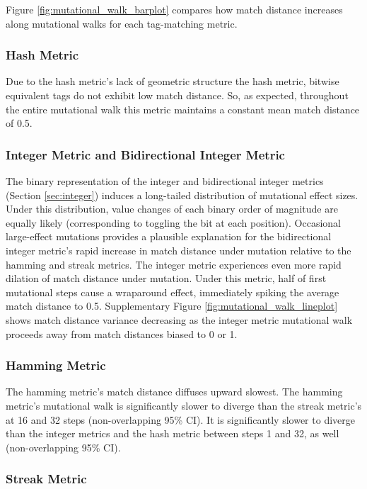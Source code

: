 Figure \ref{fig:mutational_walk_barplot} compares how match distance increases along mutational walks for each tag-matching metric.

\subsubsection{Hash Metric}

Due to the hash metric's lack of geometric structure the hash metric, bitwise equivalent tags do not exhibit low match distance.
So, as expected, throughout the entire mutational walk this metric maintains a constant mean match distance of 0.5.

\subsubsection{Integer Metric and Bidirectional Integer Metric}
\label{sec:mutation_integer}

The binary representation of the integer and bidirectional integer metrics (Section \ref{sec:integer}) induces a long-tailed distribution of mutational effect sizes.
Under this distribution, value changes of each binary order of magnitude are equally likely (corresponding to toggling the bit at each position).
Occasional large-effect mutations provides a plausible explanation for the bidirectional integer metric's rapid increase in match distance under mutation relative to the hamming and streak metrics.
The integer metric experiences even more rapid dilation of match distance under mutation.
Under this metric, half of first mutational steps cause a wraparound effect, immediately spiking the average match distance to 0.5.
Supplementary Figure \ref{fig:mutational_walk_lineplot} shows match distance variance decreasing as the integer metric mutational walk proceeds away from match distances biased to 0 or 1.

\subsubsection{Hamming Metric}

The hamming metric's match distance diffuses upward slowest.
The hamming metric's mutational walk is significantly slower to diverge than the streak metric's at 16 and 32 steps (non-overlapping 95\% CI).
It is significantly slower to diverge than the integer metrics and the hash metric between steps 1 and 32, as well (non-overlapping 95\% CI).

\subsubsection{Streak Metric}


